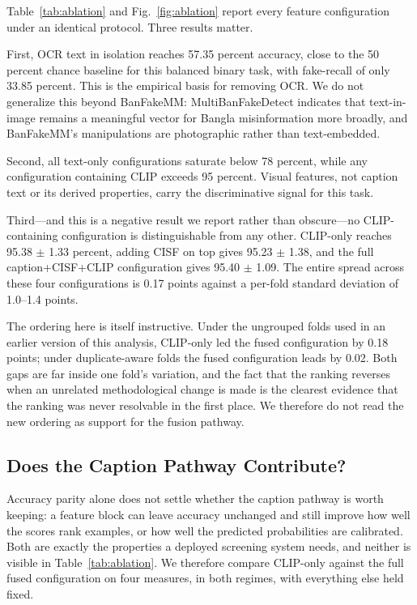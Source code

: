\documentclass[conference,a4paper]{IEEEtran}
\begin{document}
Table~\ref{tab:ablation} and Fig.~\ref{fig:ablation} report every feature
configuration under an identical protocol. Three results matter.

First, OCR text in isolation reaches 57.35 percent accuracy, close to the
50 percent chance baseline for this balanced binary task, with fake-recall of
only 33.85 percent. This is the empirical basis for removing OCR. We do not
generalize this beyond BanFakeMM: MultiBanFakeDetect \cite{multibanfake}
indicates that text-in-image remains a meaningful vector for Bangla
misinformation more broadly, and BanFakeMM's manipulations are photographic
rather than text-embedded.

Second, all text-only configurations saturate below 78 percent, while any
configuration containing CLIP exceeds 95 percent. Visual features, not caption
text or its derived properties, carry the discriminative signal for this task.

Third---and this is a negative result we report rather than obscure---no
CLIP-containing configuration is distinguishable from any other. CLIP-only
reaches 95.38 $\pm$ 1.33 percent, adding CISF on top gives
95.23 $\pm$ 1.38, and the full caption+CISF+CLIP configuration gives
95.40 $\pm$ 1.09. The entire spread across these four configurations is
0.17 points against a per-fold standard deviation of 1.0--1.4 points.

The ordering here is itself instructive. Under the ungrouped folds used in an
earlier version of this analysis, CLIP-only led the fused configuration by
0.18 points; under duplicate-aware folds the fused configuration leads by
0.02. Both gaps are far inside one fold's variation, and the fact that the
ranking reverses when an unrelated methodological change is made is the
clearest evidence that the ranking was never resolvable in the first place. We
therefore do not read the new ordering as support for the fusion pathway.

\subsection{Does the Caption Pathway Contribute?}
\label{sec:fusion}

Accuracy parity alone does not settle whether the caption pathway is worth
keeping: a feature block can leave accuracy unchanged and still improve how
well the scores rank examples, or how well the predicted probabilities are
calibrated. Both are exactly the properties a deployed screening system needs,
and neither is visible in Table~\ref{tab:ablation}. We therefore compare
CLIP-only against the full fused configuration on four measures, in both
regimes, with everything else held fixed.
\end{document}
